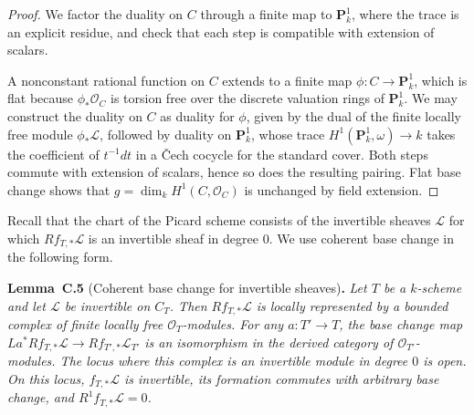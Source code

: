 \documentclass[11pt]{article}
\newenvironment{bpstatement}[2]{\par\addvspace{0.6\baselineskip}\noindent\textbf{#1}#2\textbf{.}\enspace\ignorespaces}
  {\par\addvspace{0.4\baselineskip}}
\newenvironment{bpstatementit}[2]{\begin{bpstatement}{#1}{#2}\itshape\ignorespaces}{\end{bpstatement}}
\begin{document}
\begin{proof}[{Proof}]\label{bp133}%
We factor the duality on \(C\) through a finite map to \(\mathbf P^1_k\), where the trace is an explicit residue, and check that each step is compatible with extension of scalars.

A nonconstant rational function on \(C\) extends to a finite map \(\phi:C\to\mathbf P^1_k\), which is flat because \(\phi_*\mathcal O_C\) is torsion free over the discrete valuation rings of \(\mathbf P^1_k\). We may construct the duality on \(C\) as duality for \(\phi\), given by the dual of the finite locally free module \(\phi_*\mathcal L\), followed by duality on \(\mathbf P^1_k\), whose trace \(H^1(\mathbf P^1_k,\omega)\to k\) takes the coefficient of \(t^{-1}dt\) in a Čech cocycle for the standard cover. Both steps commute with extension of scalars, hence so does the resulting pairing. Flat base change shows that \(g=\dim_kH^1(C,\mathcal O_C)\) is unchanged by field extension.
\end{proof}

\label{bp134}%
Recall that the chart of the Picard scheme consists of the invertible sheaves \(\mathcal L\) for which \(Rf_{T,*}\mathcal L\) is an invertible sheaf in degree \(0\). We use coherent base change in the following form.

\label{bp135}%
\begin{bpstatementit}{Lemma~C.5}{ (Coherent base change for invertible sheaves)}
Let \(T\) be a \(k\)-scheme and let \(\mathcal L\) be invertible on \(C_T\). Then \(Rf_{T,*}\mathcal L\) is locally represented by a bounded complex of finite locally free \(\mathcal O_T\)-modules. For any \(a:T'\to T\), the base change map \(La^*Rf_{T,*}\mathcal L\to Rf_{T',*}\mathcal L_{T'}\) is an isomorphism in the derived category of \(\mathcal O_{T'}\)-modules. The locus where this complex is an invertible module in degree \(0\) is open. On this locus, \(f_{T,*}\mathcal L\) is invertible, its formation commutes with arbitrary base change, and \(R^1f_{T,*}\mathcal L=0\).
\end{bpstatementit}
\end{document}

